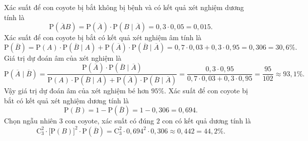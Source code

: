 \begin{ex}
{\begin{center}
		\end{center}
		\begin{itemchoice}
			\itemch Xác suất để con coyote bị bắt không bị bệnh và có kết quả xét nghiệm dương tính là
			\[\mathrm{P} \left(\overline{A}B\right) = \mathrm{P}\left(\overline{A}\right) \cdot \mathrm{P}\left(B\mid \overline{A}\right) = 0{,}3 \cdot 0{,}05 = 0{,}015. \]
			\itemch Xác suất để con coyote bị bắt có kết quả xét nghiệm âm tính là
			\[ \mathrm{P}\left(\overline{B} \right) = \mathrm{P}(A)\cdot\mathrm{P}\left(\overline{B}\mid A\right) + \mathrm{P}\left(\overline{A}\right) \cdot\mathrm{P}\left(\overline{B}\mid \overline{A} \right) = 0{,}7\cdot 0{,}03 + 0{,}3\cdot 0{,}95 = 0{,}306=30{,}6\%. \]
			\itemch Giá trị dự đoán âm của xét nghiệm là
			\[\mathrm{P}\left(\overline{A} \mid\overline{B}\right) = \dfrac{\mathrm{P}\left(\overline{A}\right)\cdot \mathrm{P}\left(\overline{B}\mid \overline{A} \right) }{\mathrm{P}(A) \cdot \mathrm{P}\left(\overline{B}\mid A \right) + \mathrm{P}\left(\overline{A}\right)\cdot \mathrm{P}\left(\overline{B}\mid \overline{A} \right)} = \dfrac{0{,}3\cdot 0{,}95}{0{,}7\cdot 0{,}03 + 0{,}3\cdot 0{,}95}=\dfrac{95}{102}\approx 93{,}1\%. \]
			Vậy giá trị dự đoán âm của xét nghiệm bé hơn $95\%$.
			\itemch Xác suất để con coyote bị bắt có kết quả xét nghiệm dương tính là
			\[\mathrm{P}(B)=1-\mathrm{P}\left(\overline{B}\right) = 1 - 0{,}306 = 0{,}694. \]
			Chọn ngẫu nhiên $3$ con coyote, xác suất có đúng $2$ con có kết quả dương tính là
			\[\mathrm{C}_3^2\cdot \big[\mathrm{P}(B)\big]^2 \cdot \mathrm{P}\left(\overline{B} \right) = \mathrm{C}_3^2 \cdot 0{,}694^2 \cdot 0{,}306 \approx 0{,}442 = 44{,}2\%. \]
		\end{itemchoice}}
\end{ex}

